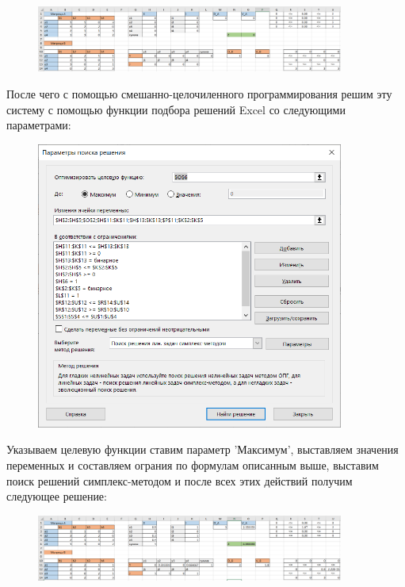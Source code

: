 \documentclass[12pt,a4paper]{article}
\begin{document}
\begin{figure}[H]
\begin{center}
  \includegraphics[width=0.9\textwidth]{img/start.PNG}
\end{center}
\end{figure}



После чего с помощью смешанно-целочиленного программирования решим эту систему с помощью функции подбора решений Excel со следующими параметрами:

\begin{figure}[H]
\begin{center}
  \includegraphics[width=0.9\textwidth]{img/par_solve.png}
\end{center}
\end{figure}


Указываем целевую функции ставим параметр 'Максимум', выставляем значения переменных и составляем ограния по формулам описанным выше, выставим поиск решений симплекс-методом и после всех этих действий получим следующее решение:

\begin{figure}[H]
\begin{center}
\includegraphics[width=0.9\textwidth]{img/end.PNG}
\end{center}
\end{figure}
\end{document}
